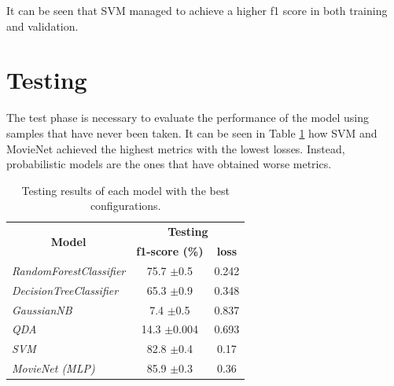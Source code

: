\documentclass[../main]{subfiles}
\begin{document}
It can be seen that SVM managed to achieve a higher f1 score in both training and validation.

\section{Testing}
The test phase is necessary to evaluate the performance of the model using samples that have never been taken.
It can be seen in Table \ref{table:test_results} how SVM and MovieNet achieved the highest metrics with the lowest losses.
Instead, probabilistic models are the ones that have obtained worse metrics.

\begin{table}[!ht]
    \center
    \begin{tabular}{|l|cc|}
        \hline
        \multicolumn{1}{|c|}{\multirow{2}{*}{\textbf{Model}}} & \multicolumn{2}{c|}{\textbf{Testing}}               \\
        \cline{2-3} 
        \multicolumn{1}{|c|}{}                                & \multicolumn{1}{c|}{\textbf{f1-score (\%)}} & \textbf{loss}  \\ 
        \hline
        \textit{RandomForestClassifier}                       & \multicolumn{1}{c|}{75.7 $\pm$0.5}             & 0.242 \\
        \hline
        \textit{DecisionTreeClassifier}                       & \multicolumn{1}{c|}{65.3 $\pm$0.9}                & 0.348  \\
        \hline
        \textit{GaussianNB}                                   & \multicolumn{1}{c|}{7.4 $\pm$0.5}                & 0.837 \\
        \hline
        \textit{QDA}                                          & \multicolumn{1}{c|}{14.3 $\pm$0.004}              & 0.693 \\
        \hline %
        \textit{SVM}                                          & \multicolumn{1}{c|}{82.8 $\pm$0.4}              & 0.17  \\
        \hline
        \textit{MovieNet (MLP)}                                     & \multicolumn{1}{c|}{85.9 $\pm$0.3}              & 0.36  \\ \hline
    \end{tabular}
    \caption{Testing results of each model with the best configurations.}
    \label{table:test_results}
\end{table}
\end{document}
